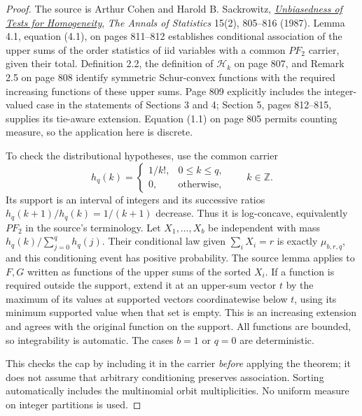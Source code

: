 \documentclass[11pt]{article}
\begin{document}
\begin{proof}
The source is Arthur Cohen and Harold B. Sackrowitz,
\href{https://doi.org/10.1214/aos/1176350376}
{\emph{Unbiasedness of Tests for Homogeneity}},
\emph{The Annals of Statistics} 15(2), 805--816 (1987).
Lemma 4.1, equation (4.1), on pages 811--812 establishes conditional
association of the upper sums of the order statistics of iid variables
with a common $PF_2$ carrier, given their total. Definition 2.2,
the definition of $\mathcal H_k$ on page 807, and Remark 2.5 on page 808
identify symmetric Schur-convex functions with the required increasing
functions of these upper sums. Page 809 explicitly includes the
integer-valued case in the statements of Sections 3 and 4; Section 5,
pages 812--815, supplies its tie-aware extension. Equation (1.1) on
page 805 permits counting measure, so the application here is discrete.

To check the distributional hypotheses, use the common carrier
\[
 h_q(k)=\begin{cases}1/k!,&0\leq k\leq q,\\0,&\text{otherwise},\end{cases}
 \qquad k\in\mathbb Z.
\]
Its support is an interval of integers and its successive ratios
$h_q(k+1)/h_q(k)=1/(k+1)$ decrease. Thus it is log-concave, equivalently
$PF_2$ in the source's terminology. Let $X_1,\ldots,X_b$ be independent
with mass $h_q(k)/\sum_{j=0}^q h_q(j)$. Their conditional law given
$\sum_iX_i=r$ is exactly $\mu_{b,r,q}$, and this conditioning event
has positive probability. The source lemma applies to $F,G$ written as
functions of the upper sums of the sorted $X_i$. If a function is
required outside the support, extend it at an upper-sum vector $t$
by the maximum of its values at supported vectors coordinatewise
below $t$, using its minimum supported value when that set is empty.
This is an increasing extension and agrees with the original function
on the support. All functions are bounded, so integrability is automatic.
The cases $b=1$ or $q=0$ are deterministic.

This checks the cap by including it in the carrier \emph{before}
applying the theorem; it does not assume that arbitrary conditioning
preserves association. Sorting automatically includes the multinomial
orbit multiplicities. No uniform measure on integer partitions is used.
\end{proof}
\end{document}
